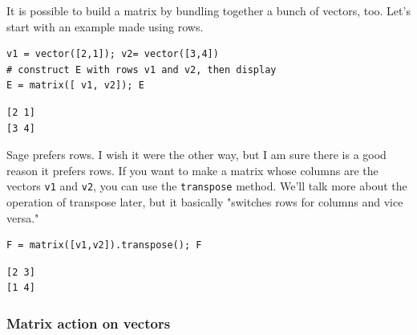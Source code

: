 \documentclass[10pt,]{book}
\theoremstyle{plain}
\numberwithin{equation}{section}
\begin{document}
        It is possible to build a matrix by bundling together a bunch of vectors,
        too. Let's start with an example made using rows.
\begin{lstlisting}[style=sageinput]
v1 = vector([2,1]); v2= vector([3,4])
# construct E with rows v1 and v2, then display
E = matrix([ v1, v2]); E
\end{lstlisting}
\begin{lstlisting}[style=sageoutput]
[2 1]
[3 4]
\end{lstlisting}
\par

        Sage prefers rows. I wish it were the other way, but I am sure there is
        a good reason it prefers rows. If you want to make a matrix whose columns
        are the vectors \verb?v1? and \verb?v2?, you can use the
        \verb?transpose? method. We'll talk more about the operation of transpose
        later, but it basically "switches rows for columns and vice versa."
\begin{lstlisting}[style=sageinput]
F = matrix([v1,v2]).transpose(); F
\end{lstlisting}
\begin{lstlisting}[style=sageoutput]
[2 3]
[1 4]
\end{lstlisting}
\typeout{************************************************}
\typeout{************************************************}
\subsubsection[Matrix action on vectors]{Matrix action on vectors}\label{subsubsection-9}
\end{document}
